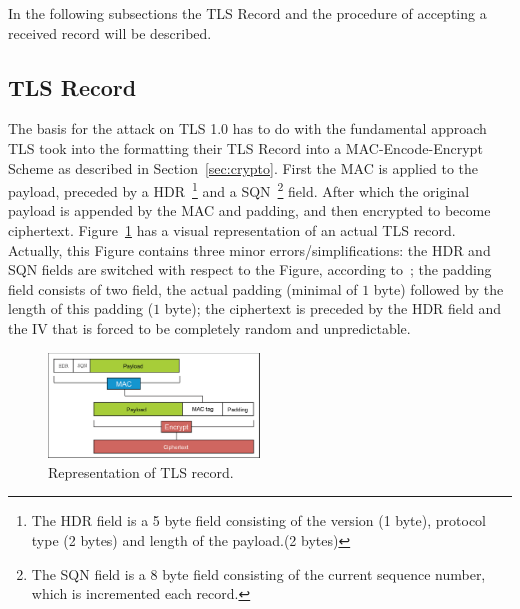 \documentclass[10pt,conference,a4paper]{IEEEtran}
\begin{document}
In the following subsections the TLS Record and the procedure of accepting a received record will be described.

\subsection{TLS Record}
\label{sec:tls:record}
The basis for the attack on TLS 1.0 has to do with the fundamental approach TLS took into the formatting their TLS Record into a MAC-Encode-Encrypt Scheme as described in Section~\ref{sec:crypto}. First the MAC is applied to the payload, preceded by a HDR~\footnote{The HDR field is a 5 byte field consisting of the version (1 byte), protocol type (2 bytes) and length of the payload.(2 bytes)} and a SQN~\footnote{The SQN field is a 8 byte field consisting of the current sequence number, which is incremented each record.} field. After which the original payload is appended by the MAC and padding, and then encrypted to become ciphertext. Figure~\ref{fig:tls} has a visual representation of an actual TLS record. Actually, this Figure contains three minor errors/simplifications: the HDR and SQN fields are switched with respect to the Figure, according to~\cite{ietf2008transport}; the padding field consists of two field, the actual padding (minimal of $1$ byte) followed by the length of this padding ($1$ byte); the ciphertext is preceded by the HDR field and the IV that is forced to be completely random and unpredictable.

\begin{figure}[h]
	\centering
	\includegraphics[width=0.5\textwidth]{tls-representation.jpg}
	\caption{Representation of TLS record.~\cite{alfardan2013lucky}}
	\label{fig:tls}
\end{figure}

\end{document}
